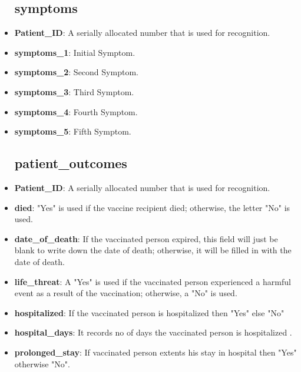 \documentclass[conference]{IEEEtran}
\begin{document}
\begin{itemize}
\subsection{\textbf{symptoms}}
\item \textbf{Patient\_ID}: A serially allocated number that is used for recognition.
\item \textbf{symptoms\_1}: Initial Symptom.
\item \textbf{symptoms\_2}: Second Symptom.
\item \textbf{symptoms\_3}: Third Symptom.
\item \textbf{symptoms\_4}: Fourth Symptom.
\item \textbf{symptoms\_5}: Fifth Symptom.

\subsection{\textbf{patient\_outcomes}}

\item \textbf{Patient\_ID}: A serially allocated number that is used for recognition.\\

\item \textbf{died}:  "Yes" is used if the vaccine recipient died; otherwise, the letter "No" is used.\\

\item \textbf{date\_of\_death}: If the vaccinated person expired, this field will just be blank to write down the date of death; otherwise, it will be filled in with the date of death.\\


\item \textbf{life\_threat}: A "Yes" is used if the vaccinated person experienced a harmful event as a result of the vaccination; otherwise, a "No" is used.\\

\item \textbf{hospitalized}: If the vaccinated person is hospitalized then "Yes" else "No"\\


\item \textbf{hospital\_days}: It records no of days the vaccinated person is hospitalized .\\


\item \textbf{prolonged\_stay}: If vaccinated person extents his stay in hospital then "Yes" otherwise "No".\\



\end{itemize}
\end{document}
